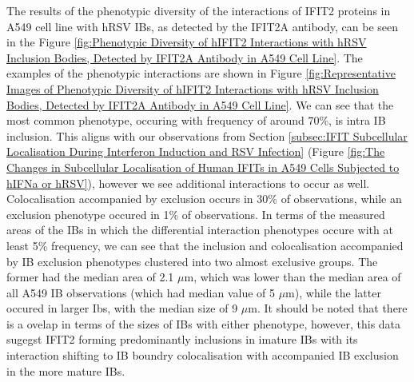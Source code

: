 The results of the phenotypic diversity of the interactions of IFIT2 proteins in A549 cell line with hRSV IBs, as detected by the IFIT2A antibody, can be seen in the Figure \ref{fig:Phenotypic Diversity of hIFIT2 Interactions with hRSV Inclusion Bodies, Detected by IFIT2A Antibody in A549 Cell Line}. The examples of the phenotypic interactions are shown in Figure \ref{fig:Representative Images of Phenotypic Diversity of hIFIT2 Interactions with hRSV Inclusion Bodies, Detected by IFIT2A Antibody in A549 Cell Line}. We can see that the most common phenotype, occuring with frequency of around 70\%, is intra IB inclusion. This aligns with our observations from Section \ref{subsec:IFIT Subcellular Localisation During Interferon Induction and RSV Infection} (Figure \ref{fig:The Changes in Subcellular Localisation of Human IFITs in A549 Cells Subjected to hIFNa or hRSV}), however we see additional interactions to occur as well. Colocalisation accompanied by exclusion occurs in 30\% of observations, while an exclusion phenotype occured in 1\% of observations. In terms of the measured areas of the IBs in which the differential interaction phenotypes occure with at least 5\% frequency, we can see that the inclusion and colocalisation accompanied by IB exclusion phenotypes clustered into two almost exclusive groups. The former had the median area of 2.1 \(\mu \mbox{m}\), which was lower than the median area of all A549 IB observations (which had median value of 5 \(\mu \mbox{m}\)), while the latter occured in larger Ibs, with the median size of 9 \(\mu \mbox{m}\). It should be noted that there is a ovelap in terms of the sizes of IBs with either phenotype, however, this data sugegst IFIT2 forming predominantly inclusions in imature IBs with its interaction shifting to IB boundry colocalisation with accompanied IB exclusion in the more mature IBs.


